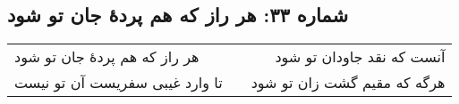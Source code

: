 \begin{center}
\section*{شماره ۳۳: هر راز که هم پردۀ جان تو شود}
\label{sec:033}
\begin{longtable}{l p{0.5cm} r}
هر راز که هم پردهٔ جان تو شود
&&
آنست که نقد جاودان تو شود
\\
تا وارد غیبی سفریست آن تو نیست
&&
هرگه که مقیم گشت زان تو شود
\\
\end{longtable}
\end{center}
